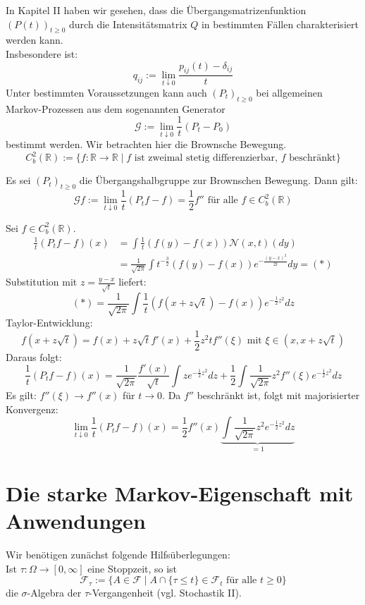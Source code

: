 \documentclass[a4paper,twoside,DIV15,BCOR12mm]{scrbook}
\newcommand{\cF}{\mathcal F}
\begin{document}
In Kapitel II haben wir gesehen, dass die Übergangsmatrizenfunktion $(P(t))_{t\geq0}$ durch die Intensitätsmatrix $Q$ in bestimmten Fällen charakterisiert werden kann. \\
Insbesondere ist:
\[
q_{ij}:=\lim_{t\downarrow0}\frac{p_{ij}(t)-\delta_{ij}}{t}
\]
Unter bestimmten Voraussetzungen kann auch $(P_t)_{t\geq0}$ bei allgemeinen Markov-Prozessen aus dem sogenannten Generator
\[
\mathcal G:=\lim_{t\downarrow0}\frac{1}{t}(P_t-P_0)
\]
bestimmt werden. Wir betrachten hier die Brownsche Bewegung.
\[
C_b^2(\mathbb R):=\{f:\mathbb R\to\mathbb R\mid f \text{ ist zweimal stetig differenzierbar, $f$ beschränkt}\}
\]
\begin{satz}
\label{satz:12.2}
  Es sei $(P_t)_{t\geq0}$ die Übergangshalbgruppe zur Brownschen Bewegung. Dann gilt:
\[
\mathcal Gf:=\lim_{t\downarrow0}\frac{1}{t}(P_tf-f)=\frac{1}{2}f''\text{ für alle }f\in C_b^2(\mathbb R)
\]
\end{satz}
\begin{beweis}
  Sei $f\in C_b^2(\mathbb R)$.
  \begin{align*}
    \frac{1}{t}(P_tf-f)(x)&=\int\frac{1}{t}(f(y)-f(x))\mathcal N(x,t)(dy) \\
&=\frac{1}{\sqrt{2\pi}}\int t^{-\frac{3}{2}}(f(y)-f(x))e^{-\frac{(y-x)^2}{2t}}dy =(*)
  \end{align*}
Substitution mit $z=\frac{y-x}{\sqrt{t}}$ liefert:
\[
(*)=\frac{1}{\sqrt{2\pi}}\int\frac{1}{t}(f(x+z\sqrt{t})-f(x))e^{-\frac{1}{2}z^2}dz
\]
Taylor-Entwicklung:
\[
f(x+z\sqrt{t})=f(x)+z\sqrt{t}f'(x)+\frac{1}{2} z^2tf''(\xi)\text{ mit }\xi\in(x,x+z\sqrt{t})
\]
Daraus folgt:
\[
\frac{1}{t}(P_tf-f)(x)=\frac{1}{\sqrt{2\pi}}\frac{f'(x)}{\sqrt{t}}\int ze^{-\frac{1}{2}z^2}dz+\frac{1}{2}\int\frac{1}{\sqrt{2\pi}}z^2f''(\xi)e^{-\frac{1}{2}z^2}dz
\]
Es gilt: $f''(\xi)\to f''(x)$ für $t\to0$. Da $f''$ beschränkt ist, folgt mit majorisierter Konvergenz:
\[
\lim_{t\downarrow0}\frac{1}{t}(P_tf-f)(x)=\frac{1}{2}f''(x)\underbrace{\int\frac{1}{\sqrt{2\pi}}z^2e^{-\frac{1}{2}z^2}dz}_{=1}
\]
\end{beweis}
\section{Die starke Markov-Eigenschaft mit Anwendungen}
Wir benötigen zunächst folgende Hilfsüberlegungen: \\
Ist $\tau:\Omega\longrightarrow[0,\infty]$ eine Stoppzeit, so ist
\[
\cF_\tau:=\{A\in\cF\mid A\cap\{\tau\leq t\}\in\cF_t\text{ für alle } t\geq0\}
\]
die $\sigma$-Algebra der $\tau$-Vergangenheit (vgl. Stochastik II).
\end{document}
